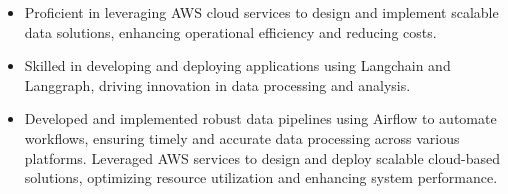 \documentclass[10pt,a4paper,ragged2e,withhyper]{imports/altacv}
\begin{document}
\tagline{}


\makecvheader


\begin{paracol}{2}


\begin{itemize}
\item Proficient in leveraging AWS cloud services to design and implement scalable data solutions, enhancing operational efficiency and reducing costs.
\item Skilled in developing and deploying applications using Langchain and Langgraph, driving innovation in data processing and analysis.
\end{itemize}


\begin{itemize}
\item Developed and implemented robust data pipelines using Airflow to automate workflows, ensuring timely and accurate data processing across various platforms.
Leveraged AWS services to design and deploy scalable cloud-based solutions, optimizing resource utilization and enhancing system performance.
\end{itemize}

\divider

\medskip



\divider


\switchcolumn



\divider





\end{paracol}
\end{document}
